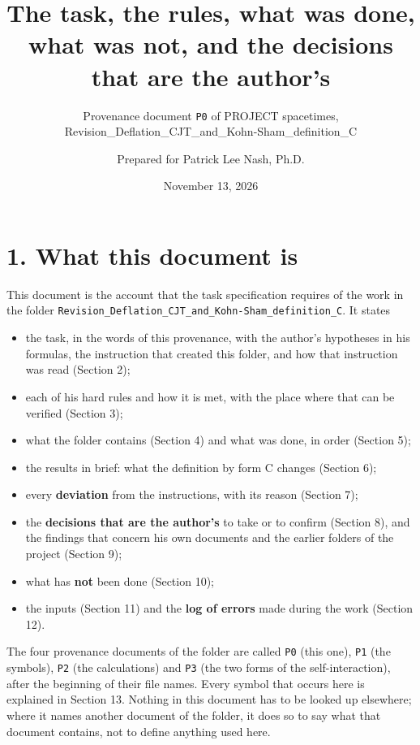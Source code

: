 \documentclass[
  10pt,
]{article}
\title{The task, the rules, what was done, what was not, and the
decisions that are the author's}
\subtitle{Provenance document \texttt{P0} of PROJECT spacetimes,
Revision\_Deflation\_CJT\_and\_Kohn-Sham\_definition\_C}
\author{Prepared for Patrick Lee Nash, Ph.D.}
\date{November 13, 2026}
\providecommand{\tightlist}{%
  \setlength{\itemsep}{0pt}\setlength{\parskip}{0pt}}
\begin{document}
\maketitle

\hypertarget{what-this-document-is}{%
\section{1. What this document is}\label{what-this-document-is}}

This document is the account that the task specification requires of the
work in the folder
\texttt{Revision\_Deflation\_CJT\_and\_Kohn-Sham\_definition\_C}. It
states

\begin{itemize}
\tightlist
\item
  the task, in the words of this provenance, with the author's
  hypotheses in his formulas, the instruction that created this folder,
  and how that instruction was read (Section 2);
\item
  each of his hard rules and how it is met, with the place where that
  can be verified (Section 3);
\item
  what the folder contains (Section 4) and what was done, in order
  (Section 5);
\item
  the results in brief: what the definition by form C changes (Section
  6);
\item
  every \textbf{deviation} from the instructions, with its reason
  (Section 7);
\item
  the \textbf{decisions that are the author's} to take or to confirm
  (Section 8), and the findings that concern his own documents and the
  earlier folders of the project (Section 9);
\item
  what has \textbf{not} been done (Section 10);
\item
  the inputs (Section 11) and the \textbf{log of errors} made during the
  work (Section 12).
\end{itemize}

The four provenance documents of the folder are called \texttt{P0} (this
one), \texttt{P1} (the symbols), \texttt{P2} (the calculations) and
\texttt{P3} (the two forms of the self-interaction), after the beginning
of their file names. Every symbol that occurs here is explained in
Section 13. Nothing in this document has to be looked up elsewhere;
where it names another document of the folder, it does so to say what
that document contains, not to define anything used here.
\end{document}
